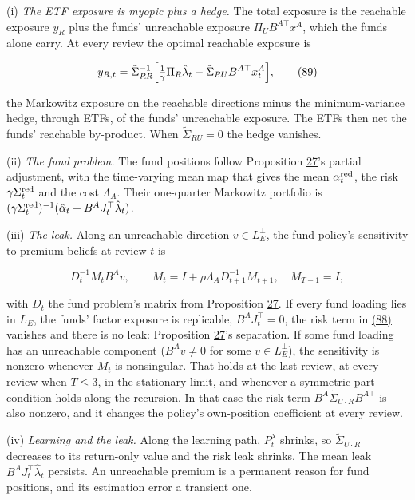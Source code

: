 \documentclass[11pt]{article}
\begin{document}
(i) \emph{The ETF exposure is myopic plus a hedge.} The total exposure is
the reachable exposure \(y_R\) plus the funds' unreachable exposure
\(\Pi_UB^{A\top}x^A\), which the funds alone carry. At every review the
optimal reachable exposure is

\begin{equation*}
y_{R,t}=\tilde\Sigma_{RR}^{-1}\Bigl[\tfrac1\gamma\Pi_R\hat\lambda_t
 -\tilde\Sigma_{RU}B^{A\top}x^A_t\Bigr],\tag{89}\label{eq:89}
\end{equation*}

the Markowitz exposure on the reachable directions minus the
minimum-variance hedge, through ETFs, of the funds' unreachable
exposure. The ETFs then net the funds' reachable by-product. When
\(\tilde\Sigma_{RU}=0\) the hedge vanishes.

(ii) \emph{The fund problem.} The fund positions follow Proposition \hyperref[res:Proposition-27]{27}'s
partial adjustment, with the time-varying mean map that gives the
mean \(\alpha^{\rm red}_t\), the risk \(\gamma\Sigma^{\rm red}_t\) and the cost
\(\Lambda_A\). Their one-quarter Markowitz portfolio is
\((\gamma\Sigma^{\rm red}_t)^{-1}(\hat\alpha_t+B^AJ_t^\top\hat\lambda_t)\).

(iii) \emph{The leak.} Along an unreachable direction \(v\in L_E^\perp\), the
fund policy's sensitivity to premium beliefs at review \(t\) is

\begin{equation*}
D_t^{-1}M_tB^Av,\qquad M_t=I+\rho\Lambda_AD_{t+1}^{-1}M_{t+1},\quad M_{T-1}=I,\tag{90}\label{eq:90}
\end{equation*}

with \(D_t\) the fund problem's matrix from Proposition \hyperref[res:Proposition-27]{27}. If every
fund loading lies in \(L_E\), the funds' factor exposure is replicable,
\(B^AJ_t^\top=0\), the risk term in \hyperref[eq:88]{(88)} vanishes and there is no leak:
Proposition \hyperref[res:Proposition-27]{27}'s separation. If some fund loading has an unreachable
component (\(B^Av\neq0\) for some \(v\in L_E^\perp\)), the sensitivity is
nonzero whenever \(M_t\) is nonsingular. That holds at the last review,
at every review when \(T\leq3\), in the stationary limit, and whenever a
symmetric-part condition holds along the recursion. In that case the
risk term \(B^A\tilde\Sigma_{U\cdot R}B^{A\top}\) is also nonzero, and it changes
the policy's own-position coefficient at every review.

(iv) \emph{Learning and the leak.} Along the learning path, \(P^\lambda_t\)
shrinks, so \(\tilde\Sigma_{U\cdot R}\) decreases to its return-only value and
the risk leak shrinks. The mean leak \(B^AJ_t^\top\hat\lambda_t\) persists. An
unreachable premium is a permanent reason for fund positions, and its
estimation error a transient one.
\end{document}
